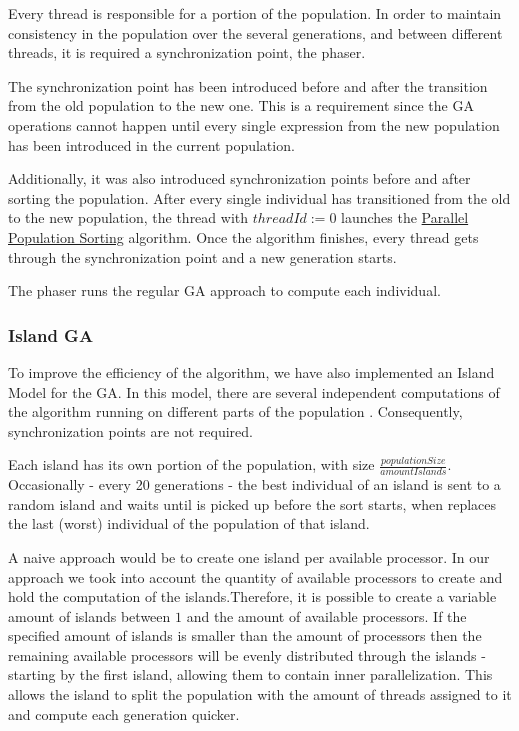 \documentclass[runningheads]{llncs}
\begin{document}
Every thread is responsible for a portion of the population. In order to maintain consistency in the population over the several generations, and between different threads, it is required a synchronization point, the phaser. 

The synchronization point has been introduced before and after the transition from the old population to the new one. This is a requirement since the GA operations cannot happen until every single expression from the new population has been introduced in the current population.

Additionally, it was also introduced synchronization points before and after sorting the population. After every single individual has transitioned from the old to the new population, the thread with \(threadId := 0\) launches the \hyperref[subsubsec:parallelSort]{Parallel Population Sorting} algorithm. Once the algorithm finishes, every thread gets through the synchronization point and a new generation starts.

The phaser runs the regular GA approach to compute each individual.

\subsubsection{Island GA} \hfill \par
To improve the efficiency of the algorithm, we have also implemented an Island Model for the GA. In this model, there are several independent computations of the algorithm running on different parts of the population \cite{islandModelGA}. Consequently, synchronization points are not required.

Each island has its own portion of the population, with size  $\frac{populationSize}{amountIslands}$. Occasionally - every 20 generations - the best individual of an island is sent to a random island and waits until is picked up before the sort starts, when replaces the last (worst) individual of the population of that island.

A naive approach would be to create one island per available processor. In our approach we took into account the quantity of available processors to create and hold the computation of the islands.Therefore, it is possible to create a variable amount of islands between $1$ and the amount of available processors. If the specified amount of islands is smaller than the amount of processors then the remaining available processors will be evenly distributed through the islands - starting by the first island, allowing them to contain inner parallelization. This allows the island to split the population with the amount of threads assigned to it and compute each generation quicker.
\end{document}
